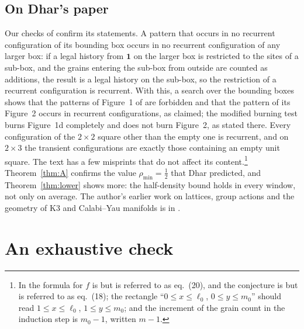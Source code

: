\documentclass[11pt]{amsart}
\theoremstyle{definition}
\newcommand{\one}{\mathbf 1}
\begin{document}
\subsection{On Dhar's paper}
Our checks of \cite{Dha99b} confirm its statements. A pattern that occurs in no recurrent configuration of its bounding box occurs in no recurrent configuration of any larger box: if a legal history from $\one$ on the larger box is restricted to the sites of a sub-box, and the grains entering the sub-box from outside are counted as additions, the result is a legal history on the sub-box, so the restriction of a recurrent configuration is recurrent. With this, a search over the bounding boxes shows that the patterns of Figure~1 of \cite{Dha99b} are forbidden and that the pattern of its Figure~2 occurs in recurrent configurations, as claimed; the modified burning test burns Figure~1d completely and does not burn Figure~2, as stated there. Every configuration of the $2\times2$ square other than the empty one is recurrent, and on $2\times3$ the transient configurations are exactly those containing an empty unit square. The text has a few misprints that do not affect its content.\footnote{In \cite[\S6]{Dha99b} the formula for $f$ is \cite[(23)]{Dha99b} but is referred to as eq.~(20), and the conjecture is \cite[(22)]{Dha99b} but is referred to as eq.~(18); the rectangle ``$0\le x\le\ell_0$, $0\le y\le m_0$'' should read $1\le x\le\ell_0$, $1\le y\le m_0$; and the increment of the grain count in the induction step is $m_0-1$, written $m-1$.} Theorem~\ref{thm:A} confirms the value $\rho_{\min}=\tfrac12$ that Dhar predicted, and Theorem~\ref{thm:lower} shows more: the half-density bound holds in every window, not only on average. The author's earlier work on lattices, group actions and the geometry of K3 and Calabi--Yau manifolds is in \cite{BBS23,Bha22,BN26,Bha22b}.

\appendix

\section{An exhaustive check}\label{app:check}
\end{document}
